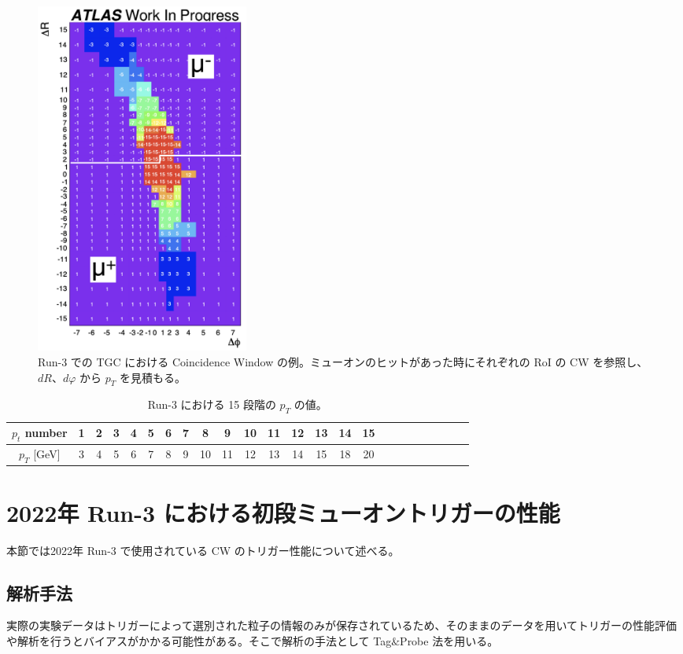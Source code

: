 \begin{figure}[tb]
  \centering
  \includegraphics[clip, width=7cm]{fig/3/cw_run3_shiomi.png}
  \caption{Run-3 での TGC における Coincidence Window の例。ミューオンのヒットがあった時にそれぞれの RoI の CW を参照し、$dR$、$dφ$ から $p_T$ を見積もる。}
  \label{fig:CW}
\end{figure}

\begin{table}[tb]
    \caption{Run-3 における 15 段階の $p_T$ の値。}
    \label{pt_number}
    \centering
    \begin{tabular}{|c|c|c|c|c|c|c|c|c|c|c|c|c|c|c|c|c|c|c|c|c|c|c|c|}
        \hline
        $p_t$ number & 1 & 2 & 3 & 4 & 5 & 6 & 7 & 8 & 9 & 10 & 11 & 12 & 13 & 14 & 15\\
        \hline
        $p_T$ [GeV] & 3 & 4 & 5 & 6 & 7 & 8 & 9 & 10 & 11 & 12 & 13 & 14 & 15 & 18 & 20\\
        \hline
    \end{tabular}
\end{table}



\section{2022年 Run-3 における初段ミューオントリガーの性能}
本節では2022年 Run-3 で使用されている CW のトリガー性能について述べる。

\subsection{解析手法}
実際の実験データはトリガーによって選別された粒子の情報のみが保存されているため、そのままのデータを用いてトリガーの性能評価や解析を行うとバイアスがかかる可能性がある。そこで解析の手法として Tag$\&$Probe 法を用いる。

